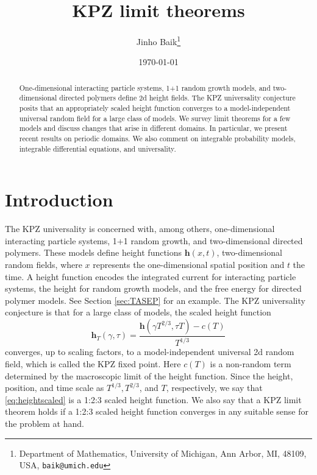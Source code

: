 \documentclass[10pt]{article}
\title{KPZ limit theorems}
\author{Jinho Baik\footnote{Department of Mathematics, University of Michigan,
Ann Arbor, MI, 48109, USA, \texttt{baik@umich.edu}}}
\date \today %
\theoremstyle{plain}
\theoremstyle{definition}
\newcommand{\beq}{ \begin{equation} }
\newcommand{\eeq}{ \end{equation} }
\newcommand{\kheight}{\mathbf{h}} %
\numberwithin{equation}{section}
\begin{document}
\maketitle

\begin{abstract}
One-dimensional interacting particle systems, 1+1 random growth models, and two-dimensional directed polymers define 2d height fields.
The KPZ universality conjecture posits that an appropriately scaled height function converges to a model-independent universal random field for a large class of models. 
We survey limit theorems for a few models and discuss changes that arise in different domains. 
In particular, we present recent results on periodic domains. 
We also comment on integrable probability models, integrable differential equations, and universality. 
\end{abstract}



\section{Introduction}


The KPZ universality is concerned with, among others, one-dimensional interacting particle systems, 1+1 random growth, and two-dimensional directed polymers. 
These models define height functions $\kheight(x, t)$, two-dimensional random fields, where $x$ represents the one-dimensional spatial position and $t$ the time.  
A height function encodes the integrated current for interacting particle systems, the height for random growth models, and the free energy for directed polymer models. See Section \ref{sec:TASEP} for an example. 
The KPZ universality conjecture is that for a large class of models, the scaled height function 
\beq \label{eq:heightscaled}
	\kheight_T(\gamma, \tau)= \frac{\kheight(\gamma T^{2/3}, \tau T) - c(T)}{T^{1/3}}
\eeq
converges, up to scaling factors, to a model-independent universal 2d random field, which is called the KPZ fixed point. 
Here $c(T)$ is a non-random term determined by the macroscopic limit of the height function. 
Since the height, position, and time scale as $T^{1/3}, T^{2/3}$, and $T$, respectively, 
we say that \eqref{eq:heightscaled} is a 1:2:3 scaled height function. 
We also say that a KPZ limit theorem holds if a 1:2:3 scaled height function converges in any suitable sense for the problem at hand. %
\end{document}
